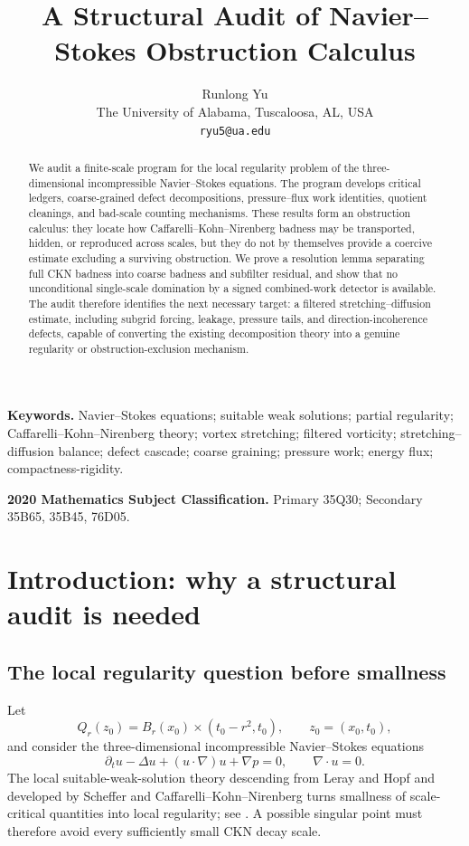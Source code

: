 \documentclass[11pt]{article}
\title{\textbf{A Structural Audit of Navier--Stokes Obstruction Calculus}}
\author{Runlong Yu\\
The University of Alabama, Tuscaloosa, AL, USA\\
\texttt{ryu5@ua.edu}}
\date{}
\numberwithin{equation}{section}
\theoremstyle{remark}
\begin{document}
\maketitle


\begin{abstract}
	We audit a finite-scale program for the local regularity problem of the three-dimensional incompressible Navier--Stokes equations. The program develops critical ledgers, coarse-grained defect decompositions, pressure--flux work identities, quotient cleanings, and bad-scale counting mechanisms. These results form an obstruction calculus: they locate how Caffarelli--Kohn--Nirenberg badness may be transported, hidden, or reproduced across scales, but they do not by themselves provide a coercive estimate excluding a surviving obstruction. We prove a resolution lemma separating full CKN badness into coarse badness and subfilter residual, and show that no unconditional single-scale domination by a signed combined-work detector is available. The audit therefore identifies the next necessary target: a filtered stretching--diffusion estimate, including subgrid forcing, leakage, pressure tails, and direction-incoherence defects, capable of converting the existing decomposition theory into a genuine regularity or obstruction-exclusion mechanism.
\end{abstract}





\noindent\textbf{Keywords.}
Navier--Stokes equations; suitable weak solutions; partial regularity; Caffarelli--Kohn--Nirenberg theory; vortex stretching; filtered vorticity; stretching--diffusion balance; defect cascade; coarse graining; pressure work; energy flux; compactness-rigidity.

\medskip
\noindent\textbf{2020 Mathematics Subject Classification.}
Primary 35Q30; Secondary 35B65, 35B45, 76D05.

\tableofcontents

\section{Introduction: why a structural audit is needed}

\subsection{The local regularity question before smallness}

Let
\[
Q_r(z_0)=B_r(x_0)\times(t_0-r^2,t_0),
\qquad z_0=(x_0,t_0),
\]
and consider the three-dimensional incompressible Navier--Stokes equations
\begin{equation}\label{eq:NS}
\partial_tu-\Delta u+(u\cdot\nabla)u+\nabla p=0,
\qquad \nabla\cdot u=0.
\end{equation}
The local suitable-weak-solution theory descending from Leray and Hopf and developed by Scheffer and Caffarelli--Kohn--Nirenberg turns smallness of scale-critical quantities into local regularity; see \cite{Leray1934,Hopf1951,Scheffer1976,CKN1982,Lin1998,ESS2003,Seregin2015}. A possible singular point must therefore avoid every sufficiently small CKN decay scale.
\end{document}
